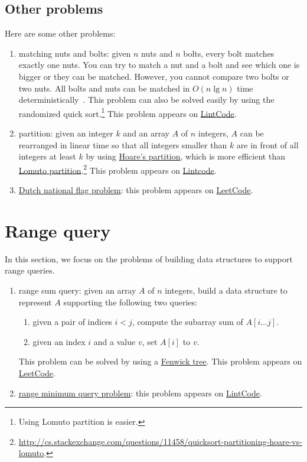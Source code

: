 \subsection{Other problems}
Here are some other problems:
\begin{enumerate}
\item matching nuts and bolts: given $n$ nuts and $n$ bolts, every bolt matches exactly one nuts. You can try to match a nut and a bolt and see which one is bigger or they can be matched. 
However, you cannot compare two bolts or two nuts. All bolts and nuts can be matched in $O(n \lg n)$ time deterministically~\cite{Komlos1998}. This problem can also be solved easily by using the randomized quick sort.\footnote{Using Lomuto partition is easier.}  This problem appears on \href{http://www.lintcode.com/en/problem/nuts-bolts-problem/}{LintCode}.
\item partition: given an integer $k$ and an array $A$ of $n$ integers, $A$ can be rearranged in linear time so that all integers smaller than $k$ are in front of all integers at least $k$ by using \href{https://en.wikipedia.org/wiki/Quicksort#Hoare_partition_scheme}{Hoare's partition}, which is more efficient than \href{https://en.wikipedia.org/wiki/Quicksort#Lomuto_partition_scheme}{Lomuto partition}.\footnote{\url{http://cs.stackexchange.com/questions/11458/quicksort-partitioning-hoare-vs-lomuto}.} This problem appears on \href{http://www.lintcode.com/en/problem/partition-array/}{Lintcode}.
\item \href{https://en.wikipedia.org/wiki/Dutch_national_flag_problem}{Dutch national flag problem}: this problem appears on \href{https://leetcode.com/problems/sort-colors/}{LeetCode}.
\end{enumerate}

\section{Range query}
In this section, we focus on the problems of building data structures to support range queries.
\begin{enumerate}
\item range sum query: given an array $A$ of $n$ integers, build a data structure to represent $A$ supporting the following two queries: 
\begin{enumerate}
\item given a pair of indices $i < j$, compute the subarray sum of $A[i \dots j]$.
\item given an index $i$ and a value $v$, set $A[i]$ to $v$.
\end{enumerate}
This problem can be solved by using a \href{https://en.wikipedia.org/wiki/Fenwick_tree}{Fenwick tree}. This problem appears on \href{https://leetcode.com/problems/range-sum-query-mutable/}{LeetCode}.
\item \href{https://en.wikipedia.org/wiki/Range_minimum_query}{range minimum query problem}: this problem appears on \href{http://www.lintcode.com/en/problem/interval-minimum-number/}{LintCode}.
\end{enumerate}



\printbibliography[heading=subbibliography]
